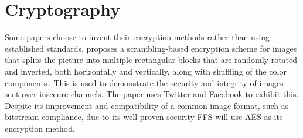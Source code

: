 \section{Cryptography}
\label{sec:rel_crypto}
Some papers choose to invent their encryption methods rather than using established standards. \citeauthor{chumanEncryptionThenCompressionSystemsUsing2019} proposes a scrambling-based encryption scheme for images that splits the picture into multiple rectangular blocks that are randomly rotated and inverted, both horizontally and vertically, along with shuffling of the color components\,\cite{chumanEncryptionThenCompressionSystemsUsing2019}. This is used to demonstrate the security and integrity of images sent over insecure channels. The paper uses Twitter and Facebook to exhibit this. Despite its improvement and compatibility of a common image format, such as bitstream compliance, due to its well-proven security \gls{FFS} will use \gls{AES} as its encryption method. 
